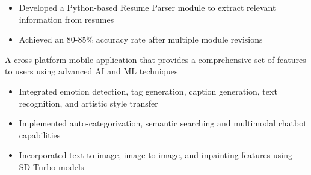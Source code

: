 \documentclass[10pt,a4paper,ragged2e,withhyper]{altacv}
\begin{document}
\begin{paracol}{2}
\divider


\begin{itemize}
\item Developed a Python-based Resume Parser module to extract relevant information from resumes
\item Achieved an 80-85\% accuracy rate after multiple module revisions
\end{itemize}






A cross-platform mobile application that provides a comprehensive set of features to users using advanced AI and ML techniques

\medskip

\begin{itemize}
\item Integrated emotion detection, tag generation, caption generation, text recognition, and artistic style transfer
\item Implemented auto-categorization, semantic searching and multimodal chatbot capabilities
\item Incorporated text-to-image, image-to-image, and inpainting features using SD-Turbo models
\end{itemize}


\end{paracol}
\end{document}
